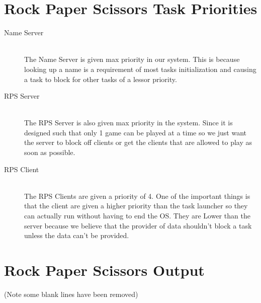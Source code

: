 \documentclass[pdftex,10pt,a4paper]{article}
\begin{document}
\section*{Rock Paper Scissors Task Priorities}
\begin{description}
\item[Name Server] \hfill \\
The Name Server is given max priority in our system. This is because looking
up a name is a requirement of most tasks initialization and causing a task to
block for other tasks of a lessor priority.

\item[RPS Server] \hfill \\
The RPS Server is also given max priority in the system. Since it is designed
such that only 1 game can be played at a time so we just want the server to block
off clients or get the clients that are allowed to play as soon as possible.

\item[RPS Client] \hfill \\
The RPS Clients are given a priority of 4. One of the important things is that
the client are given a higher priority than the task launcher so they can actually
run without having to end the OS. They are Lower than the server because we believe
that the provider of data shouldn't block a task unless the data can't be provided.
\end{description}

\newpage
\section*{Rock Paper Scissors Output}


(Note some blank lines have been removed)
\end{document}
